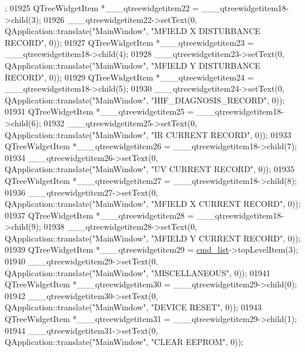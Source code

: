 \begin{DoxyCode}
      ;
01925         QTreeWidgetItem *\_\_\_qtreewidgetitem22 = \_\_\_qtreewidgetitem18->child(3);
01926         \_\_\_qtreewidgetitem22->setText(0, QApplication::translate(\textcolor{stringliteral}{"MainWindow"}, \textcolor{stringliteral}{"MFIELD X  DISTURBANCE
       RECORD"}, 0));
01927         QTreeWidgetItem *\_\_\_qtreewidgetitem23 = \_\_\_qtreewidgetitem18->child(4);
01928         \_\_\_qtreewidgetitem23->setText(0, QApplication::translate(\textcolor{stringliteral}{"MainWindow"}, \textcolor{stringliteral}{"MFIELD Y  DISTURBANCE
       RECORD"}, 0));
01929         QTreeWidgetItem *\_\_\_qtreewidgetitem24 = \_\_\_qtreewidgetitem18->child(5);
01930         \_\_\_qtreewidgetitem24->setText(0, QApplication::translate(\textcolor{stringliteral}{"MainWindow"}, \textcolor{stringliteral}{"HIF\_DIAGNOSIS\_RECORD"}, 0));
01931         QTreeWidgetItem *\_\_\_qtreewidgetitem25 = \_\_\_qtreewidgetitem18->child(6);
01932         \_\_\_qtreewidgetitem25->setText(0, QApplication::translate(\textcolor{stringliteral}{"MainWindow"}, \textcolor{stringliteral}{"IR CURRENT RECORD"}, 0));
01933         QTreeWidgetItem *\_\_\_qtreewidgetitem26 = \_\_\_qtreewidgetitem18->child(7);
01934         \_\_\_qtreewidgetitem26->setText(0, QApplication::translate(\textcolor{stringliteral}{"MainWindow"}, \textcolor{stringliteral}{"UV CURRENT RECORD"}, 0));
01935         QTreeWidgetItem *\_\_\_qtreewidgetitem27 = \_\_\_qtreewidgetitem18->child(8);
01936         \_\_\_qtreewidgetitem27->setText(0, QApplication::translate(\textcolor{stringliteral}{"MainWindow"}, \textcolor{stringliteral}{"MFIELD X  CURRENT RECORD"}, 
      0));
01937         QTreeWidgetItem *\_\_\_qtreewidgetitem28 = \_\_\_qtreewidgetitem18->child(9);
01938         \_\_\_qtreewidgetitem28->setText(0, QApplication::translate(\textcolor{stringliteral}{"MainWindow"}, \textcolor{stringliteral}{"MFIELD Y  CURRENT RECORD"}, 
      0));
01939         QTreeWidgetItem *\_\_\_qtreewidgetitem29 = \hyperlink{a00080_aa66ece71395b435e915d384fb63bac1d}{cmd\_list}->topLevelItem(3);
01940         \_\_\_qtreewidgetitem29->setText(0, QApplication::translate(\textcolor{stringliteral}{"MainWindow"}, \textcolor{stringliteral}{"MISCELLANEOUS"}, 0));
01941         QTreeWidgetItem *\_\_\_qtreewidgetitem30 = \_\_\_qtreewidgetitem29->child(0);
01942         \_\_\_qtreewidgetitem30->setText(0, QApplication::translate(\textcolor{stringliteral}{"MainWindow"}, \textcolor{stringliteral}{"DEVICE RESET"}, 0));
01943         QTreeWidgetItem *\_\_\_qtreewidgetitem31 = \_\_\_qtreewidgetitem29->child(1);
01944         \_\_\_qtreewidgetitem31->setText(0, QApplication::translate(\textcolor{stringliteral}{"MainWindow"}, \textcolor{stringliteral}{"CLEAR EEPROM"}, 0));

\end{DoxyCode}
